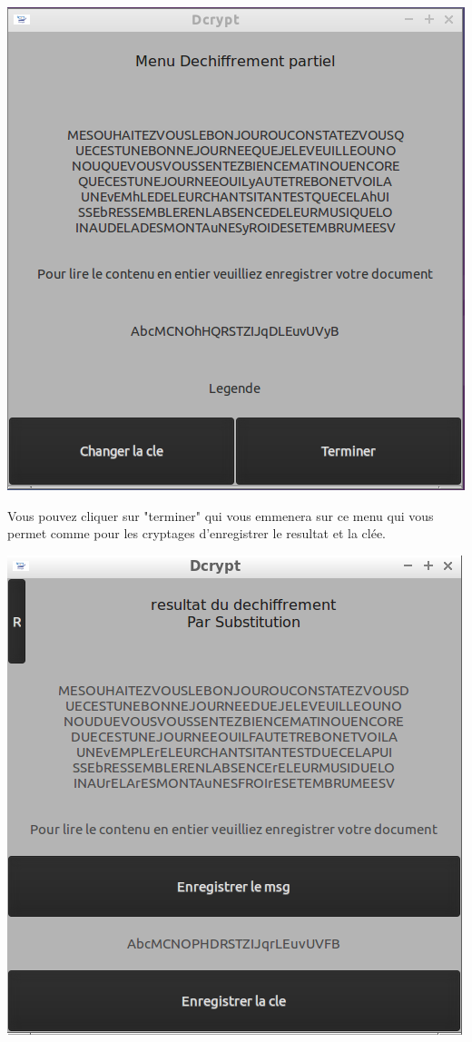 \documentclass[a4]{article}
\begin{document}
			\begin{center}\includegraphics[scale=0.4]{11.png}\end{center}
			Vous pouvez cliquer sur "terminer" qui vous emmenera sur ce menu qui vous permet comme pour 
 			les cryptages d'enregistrer le resultat et la clée.
			\begin{center}\includegraphics[scale=0.5]{24.PNG}\end{center}
			\newpage
\end{document}
